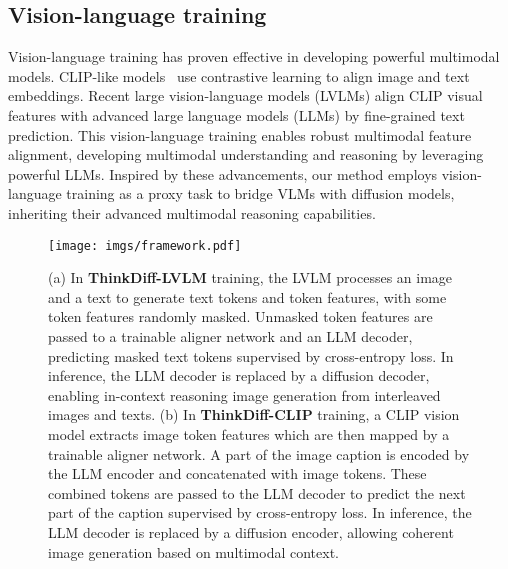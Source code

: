 \subsection{Vision-language training}
Vision-language training has proven effective in developing powerful multimodal models. CLIP-like models~\cite{radford2021learning, fang2023eva} use contrastive learning to align image and text embeddings. Recent large vision-language models (LVLMs)\cite{li2023blip, liu2023llava, zhu2023minigpt, llama3_meta, wang2024qwen2} align CLIP visual features with advanced large language models (LLMs)\cite{brown2020language, openai2024gpt4technicalreport, llama3_meta, yang2024qwen2} by fine-grained text prediction. This vision-language training enables robust multimodal feature alignment, developing multimodal understanding and reasoning by leveraging powerful LLMs.  Inspired by these advancements, our method employs vision-language training as a proxy task to bridge VLMs with diffusion models, inheriting their advanced multimodal reasoning capabilities.

\begin{figure*}[t]
  \centering
   \texttt{[image: imgs/framework.pdf]}
   \vspace{-20pt}
   \caption{(a) In \textbf{ThinkDiff-LVLM} training, the LVLM processes an image and a text to generate text tokens and token features, with some token features randomly masked. Unmasked token features are passed to a trainable aligner network and an LLM decoder, predicting masked text tokens supervised by cross-entropy loss. In inference, the LLM decoder is replaced by a diffusion decoder, enabling in-context reasoning image generation from interleaved images and texts. (b) In \textbf{ThinkDiff-CLIP} training, a CLIP vision model extracts image token features which are then mapped by a trainable aligner network. A part of the image caption is encoded by the LLM encoder and concatenated with image tokens. These combined tokens are passed to the LLM decoder to predict the next part of the caption supervised by cross-entropy loss. In inference, the LLM decoder is replaced by a diffusion encoder, allowing coherent image generation based on multimodal context.
   }
   \label{fig:framework}
\vspace{-12pt}
\end{figure*}